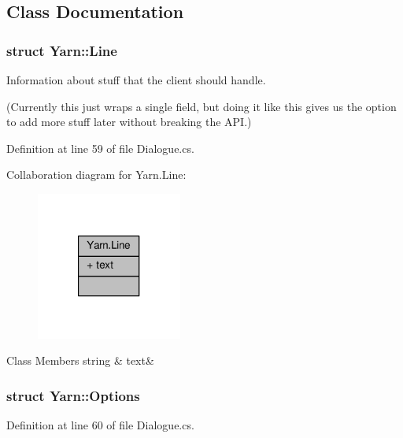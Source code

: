 \subsection{Class Documentation}
\label{a00349}
\hypertarget{a00048_a00349}{}
\subsubsection{struct Yarn\-:\-:Line}
Information about stuff that the client should handle. 

(Currently this just wraps a single field, but doing it like this gives us the option to add more stuff later without breaking the A\-P\-I.) 

Definition at line 59 of file Dialogue.\-cs.



Collaboration diagram for Yarn.\-Line\-:
\nopagebreak
\begin{figure}[H]
\begin{center}
\leavevmode
\includegraphics[width=136pt]{a00361}
\end{center}
\end{figure}
\begin{DoxyFields}{Class Members}
\hypertarget{a00048_a81d1f04bbb4cf6642d2bd685bda1da20}{string}\label{a00048_a81d1f04bbb4cf6642d2bd685bda1da20}
&
text&
\\
\hline

\end{DoxyFields}
\label{a00352}
\hypertarget{a00048_a00352}{}
\subsubsection{struct Yarn\-:\-:Options}


Definition at line 60 of file Dialogue.\-cs.



